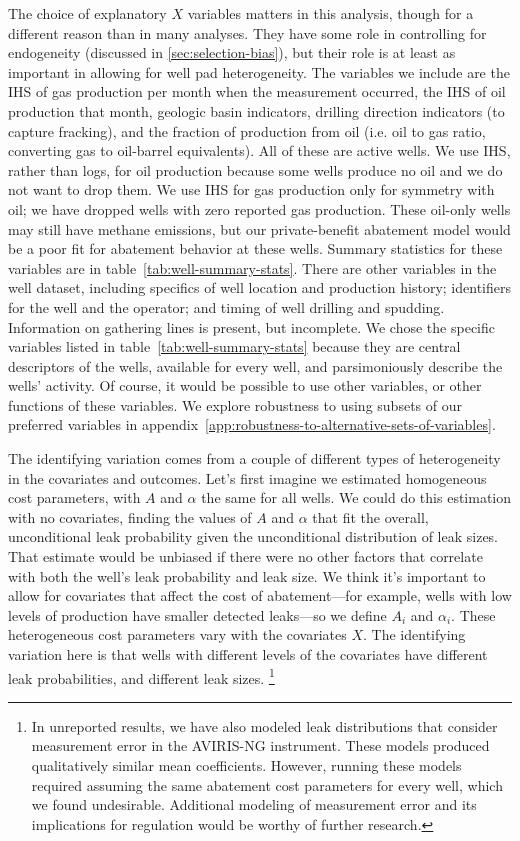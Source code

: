 \documentclass[12pt,oneside,letterpaper]{article}
\theoremstyle{definition}
\begin{document}
\begin{refsection}
The choice of explanatory \(X\) variables matters in this analysis, though for a different reason than in many analyses.
They have some role in controlling for endogeneity (discussed in \ref{sec:selection-bias}),
but their role is at least as important in allowing for well pad heterogeneity.
The variables we include are the \gls{IHS} of gas production per month when the measurement occurred, the \gls{IHS} of oil production that month, geologic basin indicators, drilling direction indicators (to capture fracking), and the fraction of production from oil (i.e. oil to gas ratio, converting gas to oil-barrel equivalents).
All of these are active wells.
We use \gls{IHS}, rather than logs, for oil production because some wells produce no oil and we do not want to drop them.
We use \gls{IHS} for gas production only for symmetry with oil;
we have dropped wells with zero reported gas production.
These oil-only wells may still have methane emissions, but our private-benefit abatement model would be a poor fit for abatement behavior at these wells.
Summary statistics for these variables are in table~\ref{tab:well-summary-stats}.
There are other variables in the well dataset, including specifics of well location and production history; identifiers for the well and the operator; and timing of well drilling and spudding.
Information on gathering lines is present, but incomplete.
We chose the specific variables listed in table~\ref{tab:well-summary-stats} because they are central descriptors of the wells, available for every well, and parsimoniously describe the wells' activity.
Of course, it would be possible to use other variables, or other functions of these variables.
We explore robustness to using subsets of our preferred variables in appendix~\ref{app:robustness-to-alternative-sets-of-variables}.


The identifying variation comes from a couple of different types of heterogeneity in the covariates and outcomes.
Let's first imagine we estimated homogeneous cost parameters, with \(A\) and \(\alpha\) the same for all wells.
We could do this estimation with no covariates, finding the values of \(A\) and \(\alpha\) that fit the overall, unconditional leak probability given the unconditional distribution of leak sizes.
That estimate would be unbiased if there were no other factors that correlate with both the well's leak probability and leak size.
We think it's important to allow for covariates that affect the cost of abatement---for example, wells with low levels of production have smaller detected leaks---so we define \(A_i\) and \(\alpha_i\).
These heterogeneous cost parameters vary with the covariates \(X\).
The identifying variation here is that wells with different levels of the covariates have different leak probabilities, and different leak sizes.
\footnote{%
In unreported results, we have also modeled leak distributions that consider measurement error in the \gls{AVIRIS-NG} instrument.
These models produced qualitatively similar mean coefficients.
However, running these models required assuming the same abatement cost parameters for every well, which we found undesirable.
Additional modeling of measurement error and its implications for regulation would be worthy of further research.
}




\end{refsection}
\end{document}
